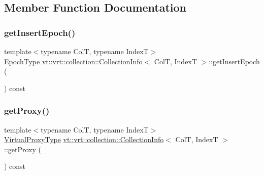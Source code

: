 \subsection{Member Function Documentation}
\mbox{\label{structvt_1_1vrt_1_1collection_1_1_collection_info_a9c81de9eeddd203f92d76d80b2e09e3c}} 
\subsubsection{\texorpdfstring{get\+Insert\+Epoch()}{getInsertEpoch()}}
{\footnotesize\ttfamily template$<$typename ColT, typename IndexT$>$ \\
\hyperlink{namespacevt_a985a5adf291c34a3ca263b3378388236}{Epoch\+Type} \hyperlink{structvt_1_1vrt_1_1collection_1_1_collection_info}{vt\+::vrt\+::collection\+::\+Collection\+Info}$<$ ColT, IndexT $>$\+::get\+Insert\+Epoch (\begin{DoxyParamCaption}{ }\end{DoxyParamCaption}) const\hspace{0.3cm}{\ttfamily [inline]}}

\mbox{\label{structvt_1_1vrt_1_1collection_1_1_collection_info_ab8b416dfab5de9f872c7588bd567cd3c}} 
\subsubsection{\texorpdfstring{get\+Proxy()}{getProxy()}}
{\footnotesize\ttfamily template$<$typename ColT, typename IndexT$>$ \\
\hyperlink{namespacevt_a1b417dd5d684f045bb58a0ede70045ac}{Virtual\+Proxy\+Type} \hyperlink{structvt_1_1vrt_1_1collection_1_1_collection_info}{vt\+::vrt\+::collection\+::\+Collection\+Info}$<$ ColT, IndexT $>$\+::get\+Proxy (\begin{DoxyParamCaption}{ }\end{DoxyParamCaption}) const\hspace{0.3cm}{\ttfamily [inline]}}

